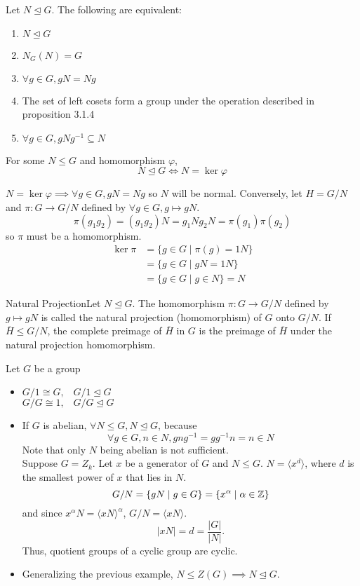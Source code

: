 \documentclass{report}
\newcommand{\thm}[2]{\begin{Theorem}{#1}{}#2\end{Theorem}}
\newcommand{\mprop}[2]{\begin{Prop}{#1}{}#2\end{Prop}}
\newcommand{\ex}[2]{\begin{Example}{#1}{}#2\end{Example}}
\newcommand{\dfn}[2]{\begin{Definition}[colbacktitle=red!75!black]{#1}{}#2\end{Definition}}
\newenvironment{myproof}[1][\proofname]{%
	\proof[\bfseries #1: ]%
}{\endproof}
\begin{document}
\thm{}{Let $N \unlhd G$. The following are equivalent:
\begin{enumerate}
    \item $N \unlhd G$
    \item $N_G (N) = G$
    \item $\forall g \in G, gN = Ng$
    \item The set of left cosets form a group under the operation described in proposition 3.1.4
    \item $\forall g \in G, gNg^{-1} \subseteq N$
\end{enumerate}}
\mprop{}{For some $N \leq G$ and homomorphism $\varphi$, $$N \unlhd G \iff N = \ker \varphi$$}
\begin{myproof}
    $N = \ker \varphi \implies \forall g \in G, gN = Ng$ so $N$ will be normal. Conversely, let $H = G/N$ and $\pi : G \to G/N$ defined by $\forall g \in G, g \mapsto gN$. 
    $$\pi (g_1 g_2) = (g_1 g_2)N = g_1N g_2 N = \pi(g_1)\pi(g_2)$$
    so $\pi$ must be a homomorphism. 
    \begin{align*}
    \ker \pi &= \{g \in G \mid \pi (g) = 1N \}\\
    &= \{g \in G \mid gN = 1N \}\\
    &= \{g \in G \mid g \in N \} = N
    \end{align*}
\end{myproof}
\dfn{Natural Projection}{Let $N \unlhd G.$ The homomorphism $\pi :G \to G/N$ defined by $g \mapsto gN$ is called the natural projection (homomorphism) of $G$ onto $G/N$. If $\overline H \leq G/N$, the complete preimage of $\overline H$ in $G$ is the preimage of $\overline H$ under the natural projection homomorphism.}
\ex{}{Let $G$ be a group
\begin{itemize}
    \item $G/1 \cong G, \hspace{10pt} G/1 \unlhd G$\\ $G/G \cong 1 , \hspace{10pt} G/G \unlhd G$
    \item If $G$ is abelian, $\forall N \leq G, N \unlhd G$, because 
    $$\forall g \in G, n \in N, gng^{-1} = gg^{-1}n = n \in N$$
    Note that only $N$ being abelian is not sufficient. \\Suppose $G = Z_k$. Let $x$ be a generator of $G$ and $N \leq G$. $N = \langle x^d \rangle$, where $d$ is the smallest power of $x$ that lies in $N$. 
    $$G/N = \{gN \mid g \in G\} = \{ x^{\alpha} \mid \alpha \in \mathbb{Z} \}$$
    and since $x^\alpha N= \langle xN \rangle ^\alpha$, $G/N = \langle xN \rangle$. $$|xN| =d = \frac{|G|}{|N|}.$$ 
    Thus, quotient groups of a cyclic group are cyclic. 
    \item Generalizing the previous example, $N \leq Z(G) \implies N \unlhd G$. 
\end{itemize}}
\end{document}
